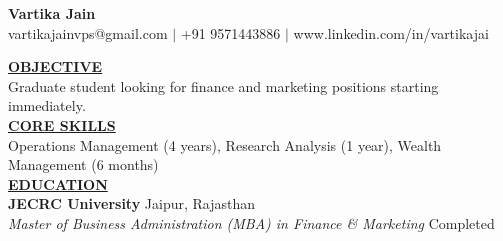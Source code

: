 \documentclass{article}
\begin{document}
\begin{center}
\thispagestyle{empty}
\large \textbf{Vartika Jain \\}
\normalsize vartikajainvps@gmail.com $\mid$ +91 9571443886 $\mid$ www.linkedin.com/in/vartikajai \\
\hrulefill
\end{center}

\noindent \textbf{\underline{OBJECTIVE}} \\
\noindent Graduate student looking for finance and marketing positions starting immediately. \\


\noindent \textbf{\underline{CORE SKILLS}} \\
Operations Management (4 years), Research Analysis (1 year), Wealth Management (6 months) \\

\noindent \textbf{\underline{EDUCATION}} \\
\textbf{JECRC University} \hfill Jaipur, Rajasthan \\
\textit{Master of Business Administration (MBA) in Finance & Marketing} \hfill Completed \\
\end{document}
